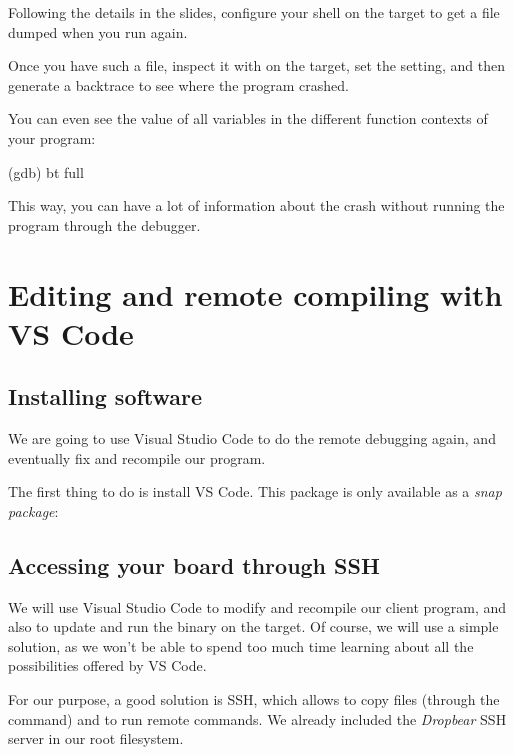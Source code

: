 Following the details in the slides, configure your shell on the
target to get a  file dumped when you run
 again.

Once you have such a file, inspect it with  on
the target, set the  setting, and then generate
a backtrace to see where the program crashed.

You can even see the value of all variables in the different
function contexts of your program:

\begin{bashinput}
(gdb) bt full
\end{bashinput}

This way, you can have a lot of information about the crash
without running the program through the debugger.

\section{Editing and remote compiling with VS Code}

\subsection{Installing software}

We are going to use Visual Studio Code to do the remote debugging
again, and eventually fix and recompile our program.

The first thing to do is install VS Code. This package is only available
as a {\em snap package}:


\subsection{Accessing your board through SSH}

We will use Visual Studio Code to modify and recompile our client
program, and also to update and run the binary on the target.
Of course, we will use a simple solution, as we won't be able to
spend too much time learning about all the possibilities offered
by VS Code.

For our purpose, a good solution is SSH, which allows to copy files
(through the  command) and to run remote commands. We already
included the {\em Dropbear} SSH server in our root filesystem.

